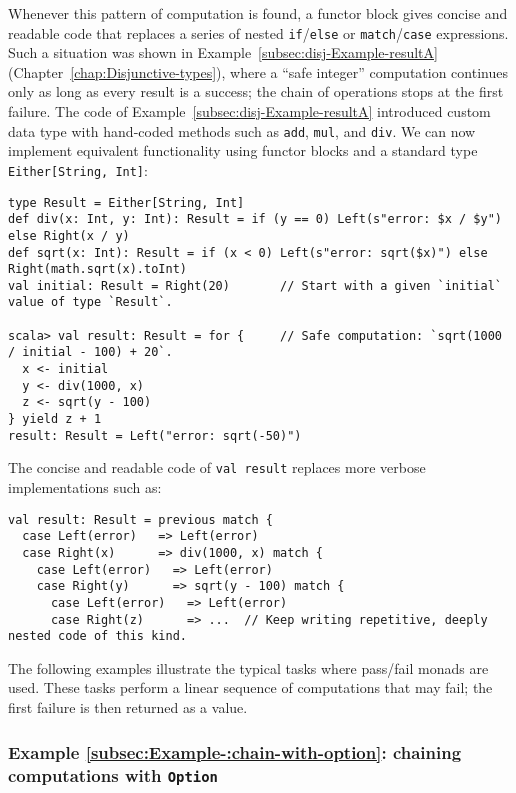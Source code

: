 Whenever this pattern of computation is found, a functor block gives
concise and readable code that replaces a series of nested \lstinline!if!/\lstinline!else!
or \lstinline!match!/\lstinline!case! expressions. Such a situation
was shown in Example~\ref{subsec:disj-Example-resultA} (Chapter~\ref{chap:Disjunctive-types}),
where a \textsf{``}safe integer\textsf{''} computation continues only as long as every
result is a success; the chain of operations stops at the first failure.
The code of Example~\ref{subsec:disj-Example-resultA} introduced
custom data type with hand-coded methods such as \lstinline!add!,
\lstinline!mul!, and \lstinline!div!. We can now implement equivalent
functionality using functor blocks and a standard type \lstinline!Either[String, Int]!:
\begin{lstlisting}
type Result = Either[String, Int]
def div(x: Int, y: Int): Result = if (y == 0) Left(s"error: $x / $y") else Right(x / y)
def sqrt(x: Int): Result = if (x < 0) Left(s"error: sqrt($x)") else Right(math.sqrt(x).toInt)
val initial: Result = Right(20)       // Start with a given `initial` value of type `Result`.

scala> val result: Result = for {     // Safe computation: `sqrt(1000 / initial - 100) + 20`.
  x <- initial
  y <- div(1000, x)
  z <- sqrt(y - 100)
} yield z + 1
result: Result = Left("error: sqrt(-50)")
\end{lstlisting}
The concise and readable code of \lstinline!val result! replaces
more verbose implementations such as:
\begin{lstlisting}
val result: Result = previous match {
  case Left(error)   => Left(error)
  case Right(x)      => div(1000, x) match {
    case Left(error)   => Left(error)
    case Right(y)      => sqrt(y - 100) match {
      case Left(error)   => Left(error)
      case Right(z)      => ...  // Keep writing repetitive, deeply nested code of this kind.
\end{lstlisting}

The following examples illustrate the typical tasks where pass/fail
monads are used. These tasks perform a linear sequence of computations
that may fail; the first failure is then returned as a value.

\subsubsection{Example \label{subsec:Example-:chain-with-option}\ref{subsec:Example-:chain-with-option}:
chaining computations with \texttt{Option}}

